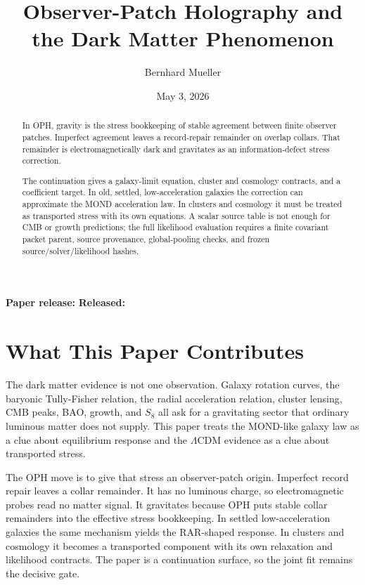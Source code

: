 \documentclass[11pt]{article}
\title{Observer-Patch Holography and the Dark Matter Phenomenon}
\author{Bernhard Mueller}
\date{May 3, 2026}
\begin{document}
\maketitle
\begin{center}
\small\textbf{Paper release:} \OPHPaperReleaseID\quad
\textbf{Released:} \OPHPaperReleaseDate
\end{center}

\begin{abstract}
In OPH, gravity is the stress bookkeeping of stable agreement between finite observer patches. Imperfect agreement leaves a record-repair remainder on overlap collars. That remainder is electromagnetically dark and gravitates as an information-defect stress correction.

The continuation gives a galaxy-limit equation, cluster and cosmology contracts, and a coefficient target. In old, settled, low-acceleration galaxies the correction can approximate the MOND acceleration law. In clusters and cosmology it must be treated as transported stress with its own equations. A scalar source table is not enough for CMB or growth predictions; the full likelihood evaluation requires a finite covariant packet parent, source provenance, global-pooling checks, and frozen source/solver/likelihood hashes.
\end{abstract}

\section*{What This Paper Contributes}

The dark matter evidence is not one observation. Galaxy rotation curves, the baryonic
Tully-Fisher relation, the radial acceleration relation, cluster lensing, CMB peaks, BAO, growth,
and \(S_8\) all ask for a gravitating sector that ordinary luminous matter does not supply. This
paper treats the MOND-like galaxy law as a clue about equilibrium response and the \(\Lambda\)CDM
evidence as a clue about transported stress.

The OPH move is to give that stress an observer-patch origin. Imperfect record repair leaves a
collar remainder. It has no luminous charge, so electromagnetic probes read no matter signal. It
gravitates because OPH puts stable collar remainders into the effective stress bookkeeping.
In settled low-acceleration galaxies the same mechanism yields the RAR-shaped response. In
clusters and cosmology it becomes a transported component with its own relaxation and likelihood
contracts. The paper is a continuation surface, so the joint fit remains the decisive gate.
\end{document}
